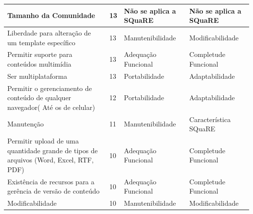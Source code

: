 \begin{apendicesenv}
\begin{longtable}{|p{175pt}|p{18pt}|p{110pt}|p{120pt}|}
 {\raggedright {Tamanho da Comunidade}}
  	 	 & {\raggedright {13}}
  	 	 & {\raggedright {Não se aplica a SQuaRE}}
  	 	 & {\raggedright {Não se aplica a SQuaRE}}\\
  	 	\hline
 {\raggedright {Liberdade para alteração de um template específico}}
  	 	 & {\raggedright {13}}
  	 	 & {\raggedright {Manutenibilidade}}
  	 	 & {\raggedright {Modificabilidade}}\\
  	 	\hline
  {\raggedright {Permitir suporte para conteúdos multimídia}}
   	 	 & {\raggedright {13}}
   	 	 & {\raggedright {Adequação Funcional}}
   	 	 & {\raggedright {Completude Funcional}}\\
   	 	\hline
 {\raggedright {Ser multiplataforma}}
   	 	 & {\raggedright {13}}
   	 	 & {\raggedright {Portabilidade}}
   	 	 & {\raggedright {Adaptabilidade}}\\
   	 	\hline
   	 	  	 	
 {\raggedright {Permitir o gerenciamento de conteúdo de qualquer navegador( Até os de celular)}}
  	 	 & {\raggedright {12}}
  	 	 & {\raggedright {Portabilidade}}
  	 	 & {\raggedright {Adaptabilidade}}\\
  	 	\hline
  
 {\raggedright {Manutenção}}
  	 	 & {\raggedright {11}}
  	 	 & {\raggedright {Manutenibilidade}}
  	 	 & {\raggedright {Característica SQuaRE}}\\
  	 	\hline  
   	 	
 {\raggedright {Permitir upload de uma quantidade grande de tipos de arquivos (Word, Excel, RTF, PDF)}}
  	 	 & {\raggedright {10}}
  	 	 & {\raggedright {Adequação Funcional}}
  	 	 & {\raggedright {Completude Funcional}}\\
  	 	\hline
  	 	
  	 	{\raggedright {Existência de recursos para a gerência de versão de conteúdo}}
  	 	  	 	 & {\raggedright {10}}
  	 	  	 	 & {\raggedright {Adequação Funcional}}
  	 	  	 	 & {\raggedright {Completude Funcional}}\\
  	 	  	 	\hline
  	 	
  	 	 
  	{\raggedright {Modificabilidade}}
  	 	  	 	 & {\raggedright {10}}
  	 	  	 	 & {\raggedright {Manutenibilidade}}
  	 	  	 	 & {\raggedright {Modificabilidade}}\\
  	 	  	 	\hline
  	 	

\end{longtable}
\end{apendicesenv}
